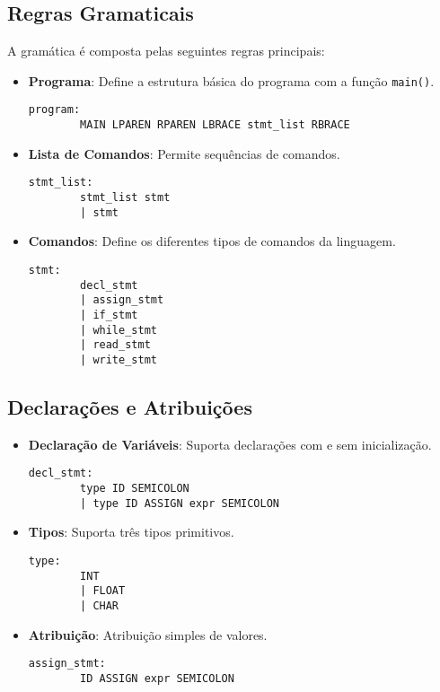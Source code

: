 \documentclass[10pt,twocolumn]{article}
\begin{document}
    \subsection{Regras Gramaticais}
        A gramática é composta pelas seguintes regras principais:
        \begin{itemize}
            \item \textbf{Programa}: Define a estrutura básica do programa com a função \texttt{main()}.
            \begin{lstlisting}[caption=Estrutra do programa,captionpos=b]
    program:
        MAIN LPAREN RPAREN LBRACE stmt_list RBRACE
            \end{lstlisting}

            \item \textbf{Lista de Comandos}: Permite sequências de comandos.
            \begin{lstlisting}[caption=Sequência de comandos,captionpos=b]
    stmt_list:
        stmt_list stmt
        | stmt
            \end{lstlisting}

            \item \textbf{Comandos}: Define os diferentes tipos de comandos da linguagem.
            \begin{lstlisting}[caption=Definição de comandos,captionpos=b]
    stmt:
        decl_stmt
        | assign_stmt
        | if_stmt
        | while_stmt
        | read_stmt
        | write_stmt
            \end{lstlisting}
        \end{itemize}
    
    \subsection{Declarações e Atribuições}

        \begin{itemize}
            \item \textbf{Declaração de Variáveis}: Suporta declarações com e sem inicialização.
            \begin{lstlisting}[caption=Declaração de variável,captionpos=b]
    decl_stmt:
        type ID SEMICOLON
        | type ID ASSIGN expr SEMICOLON
            \end{lstlisting}

            \item \textbf{Tipos}: Suporta três tipos primitivos.
            \begin{lstlisting}[caption=Tipos de variável,captionpos=b]
    type:
        INT
        | FLOAT
        | CHAR
            \end{lstlisting}

            \item \textbf{Atribuição}: Atribuição simples de valores.
            \begin{lstlisting}[caption=Atribuição,captionpos=b]
    assign_stmt:
        ID ASSIGN expr SEMICOLON
            \end{lstlisting}
        \end{itemize}   
    
\end{document}
